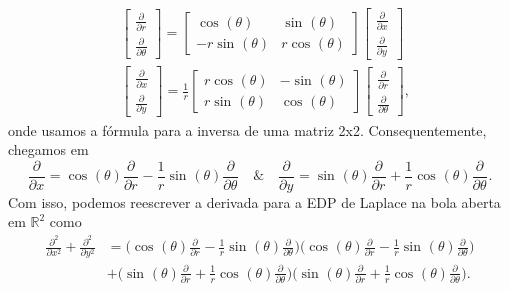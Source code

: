 \documentclass[../pde_notes.tex]{subfiles}
\begin{document}
\begin{align*}
	 & \begin{bmatrix}
		   \frac{\partial^{}}{\partial r^{}} \\
		   \frac{\partial^{}}{\partial \theta ^{}}
	   \end{bmatrix} = \begin{bmatrix}
		                   \cos^{}{(\theta )}   & \sin^{}{(\theta )}  \\
		                   -r\sin^{}{(\theta )} & r\cos^{}{(\theta )}
	                   \end{bmatrix} \begin{bmatrix}
		                                 \frac{\partial^{}}{\partial x^{}} \\
		                                 \frac{\partial^{}}{\partial y^{}}
	                                 \end{bmatrix}             \\
	 & \begin{bmatrix}
		   \frac{\partial^{}}{\partial x^{}} \\
		   \frac{\partial^{}}{\partial y ^{}}
	   \end{bmatrix} = \frac{1}{r}\begin{bmatrix}
		                              r\cos^{}{(\theta )} & -\sin^{}{(\theta )} \\
		                              r\sin^{}{(\theta )} & \cos^{}{(\theta )}
	                              \end{bmatrix} \begin{bmatrix}
		                                            \frac{\partial^{}}{\partial r^{}} \\
		                                            \frac{\partial^{}}{\partial \theta ^{}}
	                                            \end{bmatrix},
\end{align*}
onde usamos a fórmula para a inversa de uma matriz 2x2. Consequentemente, chegamos em
\[
	\frac{\partial^{}}{\partial x^{}} = \cos^{}{(\theta )}\frac{\partial^{}}{\partial r^{}} - \frac{1}{r}\sin^{}{(\theta )}\frac{\partial^{}}{\partial \theta ^{}} \quad\&\quad \frac{\partial^{}}{\partial y^{}} = \sin^{}{(\theta )}\frac{\partial^{}}{\partial r^{}} + \frac{1}{r}\cos^{}{(\theta )}\frac{\partial^{}}{\partial \theta ^{}}.
\]
Com isso, podemos reescrever a derivada para a EDP de Laplace na bola aberta em \(\mathbb{R}^{2}\) como
\begin{align*}
	\frac{\partial^{2}}{\partial x^{2}} + \frac{\partial^{2}}{\partial y^{2}} & =  \biggl(\cos^{}{(\theta )}\frac{\partial^{}}{\partial r^{}} - \frac{1}{r}\sin^{}{(\theta )}\frac{\partial^{}}{\partial \theta ^{}}\biggr)\biggl(\cos^{}{(\theta )}\frac{\partial^{}}{\partial r^{}} - \frac{1}{r}\sin^{}{(\theta )}\frac{\partial^{}}{\partial \theta ^{}}\biggr) \\
	                                                                          & + \biggl(\sin^{}{(\theta )}\frac{\partial^{}}{\partial r^{}}+\frac{1}{r}\cos^{}{(\theta )}\frac{\partial^{}}{\partial \theta ^{}}\biggr)\biggl(\sin^{}{(\theta )}\frac{\partial^{}}{\partial r^{}} + \frac{1}{r}\cos^{}{(\theta )}\frac{\partial^{}}{\partial \theta ^{}}\biggr).
\end{align*}
\end{document}
